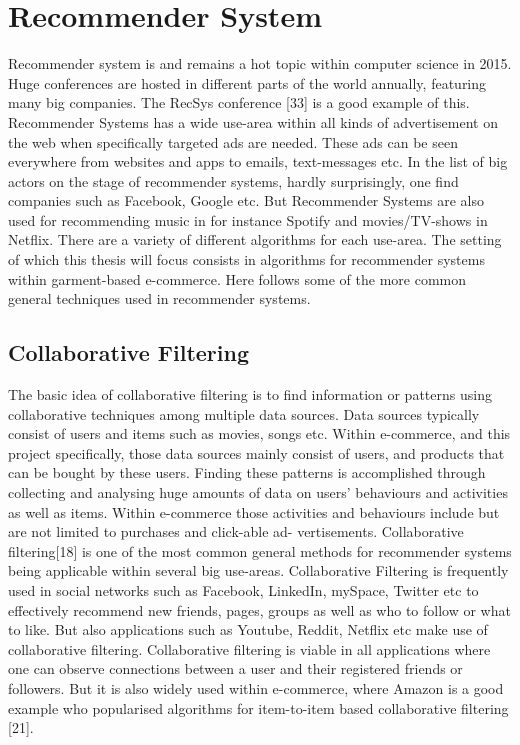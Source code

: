 \chapter{Recommender System}
Recommender system is and remains a hot topic within computer science in 2015. Huge conferences are hosted in different parts of the world annually, featuring many big companies. The RecSys conference [33] is a good example
of this. Recommender Systems has a wide use-area within all kinds of advertisement on the web when specifically targeted ads are needed. These ads can be seen everywhere from websites and apps to emails, text-messages etc. In the list of big actors on the stage of recommender systems, hardly surprisingly, one find companies such as Facebook, Google etc. But Recommender Systems are also used for recommending music in for instance Spotify and movies/TV-shows in Netflix. There are a variety of different algorithms for each use-area. The setting of which this thesis will focus consists in algorithms for recommender systems within garment-based e-commerce. Here follows some of the more common general techniques used in recommender systems.

\cite{Adomavicius2005}
\nocite{Adomavicius2015}
\nocite{Aggarwal2013}
\nocite{Aggarwal2015}
\nocite{Ansari2000}
\nocite{Bobadilla}
\nocite{Bobadilla2013}

\section{Collaborative Filtering}
The basic idea of collaborative filtering is to find information or patterns using collaborative techniques among multiple data sources. Data sources typically consist of users and items such as movies, songs etc. Within e-commerce, and this project specifically, those data sources mainly consist of users, and products that can be bought by these users. Finding these patterns is accomplished through collecting and analysing huge amounts of data on users’ behaviours and activities as well as items. Within e-commerce those activities and behaviours include but are not limited to purchases and click-able ad- vertisements. Collaborative filtering[18] is one of the most common general methods for recommender systems being applicable within several big use-areas. Collaborative Filtering is frequently used in social networks such as Facebook, LinkedIn, mySpace, Twitter etc to effectively recommend new friends, pages, groups as well as who to follow or what to like. But also applications such as Youtube, Reddit, Netflix etc make use of collaborative filtering. Collaborative filtering is viable in all applications where one can observe connections between a user and their registered friends or followers. But it is also widely used within e-commerce, where Amazon is a good example who popularised algorithms for item-to-item based collaborative filtering [21].


